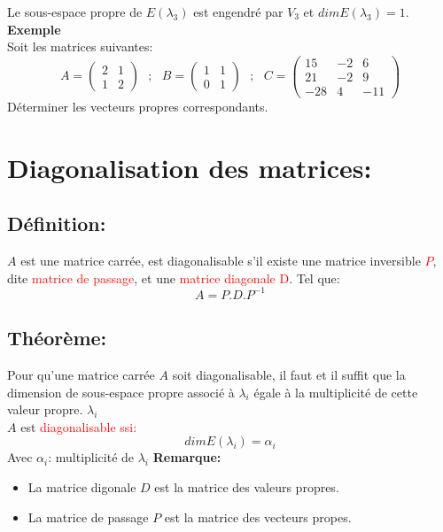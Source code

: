 \documentclass[a4paper,12pt,french]{article}
\begin{document}
Le sous-espace propre de $E(\lambda_{3})$ est engendré par $V_{3} $ et $dim E(\lambda_{3})=1$.\\
\textbf{Exemple}\\
Soit les matrices suivantes:
\[A=\begin{pmatrix}
	2 & 1  \\
	1 & 2 
	
\end{pmatrix}~~~; ~~~B=\begin{pmatrix}
1 & 1  \\
0 & 1 

\end{pmatrix}~~~; ~~~C=\begin{pmatrix}
15 & -2 & 6  \\
21 & -2 & 9\\
-28 & 4 & -11

\end{pmatrix}
\]
Déterminer les vecteurs propres correspondants.
\section{Diagonalisation des matrices:}
\subsection{Définition:}
$A$ est une matrice carrée, est diagonalisable s'il existe une matrice inversible \textcolor{red} {$P$}, dite \textcolor{red}{matrice de passage}, et une \textcolor{red}{ matrice diagonale} \textcolor{red}{D}. Tel que: \[A=P.D.P^{-1}\]
\subsection{Théorème:}
Pour qu'une matrice carrée $A$ soit diagonalisable, il faut et il suffit que la dimension de sous-espace propre associé à $\lambda_{i}$ égale à la multiplicité de cette valeur propre. $\lambda_{i}$\\
$A$ est \textcolor{red}{diagonalisable ssi:}
\[dim E(\lambda_{i})=\alpha_{i}\] Avec $\alpha_{i}$: multiplicité de $ \lambda_{i}$
\textbf{Remarque:}\\
\begin{itemize}
	\item La matrice digonale $D$ est la matrice des valeurs propres.
	\item La matrice de passage $P$ est la matrice des vecteurs propes.
\end{itemize}
\end{document}
